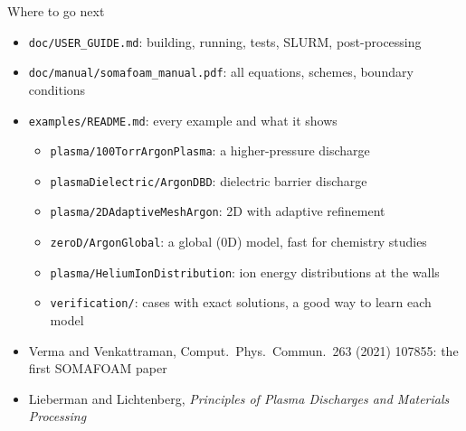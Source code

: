 \documentclass[aspectratio=169,11pt]{beamer}
\newcommand{\kw}[1]{\texttt{#1}}
\begin{document}
\begin{frame}{Where to go next}
  \begin{itemize}
    \item \kw{doc/USER\_GUIDE.md}: building, running, tests, SLURM, post-processing
    \item \kw{doc/manual/somafoam\_manual.pdf}: all equations, schemes, boundary conditions
    \item \kw{examples/README.md}: every example and what it shows
          \begin{itemize}\small
            \item \kw{plasma/100TorrArgonPlasma}: a higher-pressure discharge
            \item \kw{plasmaDielectric/ArgonDBD}: dielectric barrier discharge
            \item \kw{plasma/2DAdaptiveMeshArgon}: 2D with adaptive refinement
            \item \kw{zeroD/ArgonGlobal}: a global (0D) model, fast for chemistry studies
            \item \kw{plasma/HeliumIonDistribution}: ion energy distributions at the walls
            \item \kw{verification/}: cases with exact solutions, a good way to learn each model
          \end{itemize}
    \item Verma and Venkattraman, Comput.\ Phys.\ Commun.\ 263 (2021) 107855: the first SOMAFOAM paper
    \item Lieberman and Lichtenberg, \emph{Principles of Plasma Discharges and Materials Processing}
  \end{itemize}
\end{frame}
\end{document}
